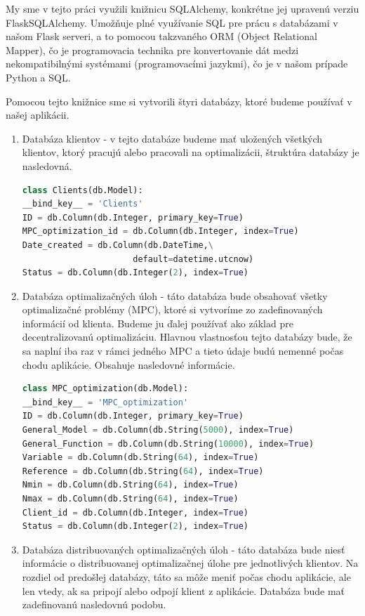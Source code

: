 My sme v tejto práci využili knižnicu SQLAlchemy, konkrétne jej upravenú verziu FlaskSQLAlchemy. Umožňuje plné využívanie SQL pre prácu s databázami v našom Flask serveri, a to pomocou takzvaného ORM (Object Relational Mapper), čo je programovacia technika pre konvertovanie dát medzi nekompatibilnými systémami (programovacími jazykmi), čo je v našom prípade Python a SQL. 

Pomocou tejto knižnice sme si vytvorili štyri databázy, ktoré budeme používať v našej aplikácii. 
\label{DB:Klient}
\begin{enumerate}
\item{ Databáza klientov - v tejto databáze budeme mať uložených všetkých klientov, ktorý pracujú alebo pracovali na optimalizácii, štruktúra databázy je nasledovná.
\begin{lstlisting}[language=Python]
class Clients(db.Model):
__bind_key__ = 'Clients'
ID = db.Column(db.Integer, primary_key=True)
MPC_optimization_id = db.Column(db.Integer, index=True)
Date_created = db.Column(db.DateTime,\
                      default=datetime.utcnow)
Status = db.Column(db.Integer(2), index=True) 
\end{lstlisting}
}
\label{DB:OPT}
\item{ Databáza optimalizačných úloh - táto databáza bude obsahovať všetky optimalizačné problémy (MPC), ktoré si vytvoríme zo zadefinovaných informácií od klienta. Budeme ju ďalej používať ako základ pre decentralizovanú optimalizáciu. Hlavnou vlastnosťou tejto databázy bude, že sa naplní iba raz v rámci jedného MPC a tieto údaje budú nemenné počas chodu aplikácie. Obsahuje nasledovné informácie.
\begin{lstlisting}[language=Python]
class MPC_optimization(db.Model):
__bind_key__ = 'MPC_optimization'
ID = db.Column(db.Integer, primary_key=True)
General_Model = db.Column(db.String(5000), index=True)
General_Function = db.Column(db.String(10000), index=True)
Variable = db.Column(db.String(64), index=True)
Reference = db.Column(db.String(64), index=True)
Nmin = db.Column(db.String(64), index=True)
Nmax = db.Column(db.String(64), index=True)
Client_id = db.Column(db.Integer, index=True)
Status = db.Column(db.Integer(2), index=True)
\end{lstlisting}
}
\label{DB:WORKER}
\item{ Databáza distribuovaných optimalizačných úloh - táto databáza bude niesť informácie o distribuovanej optimalizačnej úlohe pre jednotlivých klientov. Na rozdiel od predošlej databázy, táto sa môže meniť počas chodu aplikácie, ale len vtedy, ak sa pripojí alebo odpojí klient z aplikácie. Databáza bude mať zadefinovanú nasledovnú podobu. 
}
\end{enumerate}
